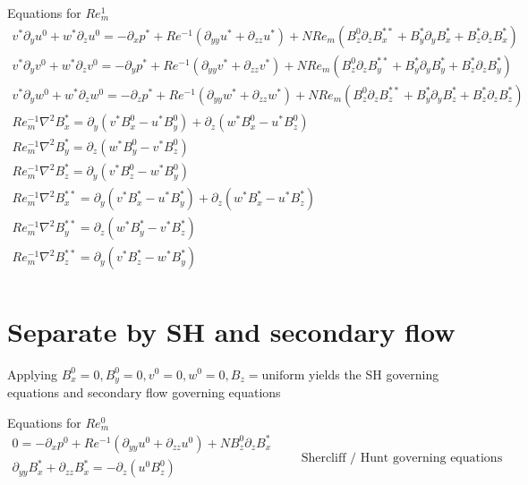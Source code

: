 \documentclass[11pt]{article}
\newcommand{\PD}{\partial}
\begin{document}
Equations for $Re_m^1$
\begin{equation}\begin{aligned}
v^* \PD_y u^0 + w^* \PD_z u^0 = -\PD_x p^*+ Re^{-1} (\PD_{yy} u^* + \PD_{zz} u^*) + N Re_m (B_z^0 \PD_z B_x^{**} + B_y^* \PD_y B_x^* + B_z^* \PD_z B_x^* ) \\
v^* \PD_y v^0 + w^* \PD_z v^0 = -\PD_y p^*+ Re^{-1} (\PD_{yy} v^* + \PD_{zz} v^*) + N Re_m (B_z^0 \PD_z B_y^{**} + B_y^* \PD_y B_y^* + B_z^* \PD_z B_y^* ) \\
v^* \PD_y w^0 + w^* \PD_z w^0 = -\PD_z p^*+ Re^{-1} (\PD_{yy} w^* + \PD_{zz} w^*) + N Re_m (B_z^0 \PD_z B_z^{**} + B_y^* \PD_y B_z^* + B_z^* \PD_z B_z^* ) \\
Re_m^{-1} \nabla^2 B_x^{*}  = \PD_y (v^* B_x^{0} - u^* B_y^{0}) + \PD_z (w^* B_x^{0} - u^* B_z^{0}) \\
Re_m^{-1} \nabla^2 B_y^{*}  = \PD_z (w^* B_y^{0} - v^* B_z^{0}) \\
Re_m^{-1} \nabla^2 B_z^{*}  = \PD_y (v^* B_z^{0} - w^* B_y^{0}) \\
Re_m^{-1} \nabla^2 B_x^{**} = \PD_y (v^* B_x^{*} - u^* B_y^{*}) + \PD_z (w^* B_x^{*} - u^* B_z^{*}) \\
Re_m^{-1} \nabla^2 B_y^{**} = \PD_z (w^* B_y^{*} - v^* B_z^{*}) \\
Re_m^{-1} \nabla^2 B_z^{**} = \PD_y (v^* B_z^{*} - w^* B_y^{*}) \\
\end{aligned}\end{equation}

\section{Separate by SH and secondary flow}
Applying $B_x^0=0,B_y^0=0,v^0=0, w^0=0,B_z=\text{uniform}$ yields the SH governing equations and secondary flow governing equations

Equations for $Re_m^0$
\begin{equation}\boxed{\begin{aligned}
0 = -\PD_x p^0 + Re^{-1} (\PD_{yy} u^0 + \PD_{zz} u^0 ) + N B_z^0 \PD_z B_x^* \\
\PD_{yy} B_x^* + \PD_{zz} B_x^* = - \PD_z (u^0 B_z^0) \\
\end{aligned}} \qquad \text{Shercliff / Hunt governing equations}\end{equation}
\end{document}
